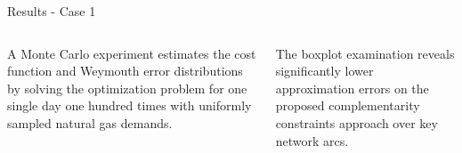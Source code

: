 \documentclass[hyperref={colorlinks,citecolor=blue,linkcolor=blue,urlcolor=blue}]{beamer}
\newlength\figureheight
\newlength\figurewidth
\begin{document}
\begin{frame}{Results - Case 1}
\scriptsize
\begin{columns}[t,onlytextwidth]
    \begin{column}{0.48\textwidth}
        A Monte Carlo experiment estimates the cost function and Weymouth error distributions by solving the optimization problem for one single day one hundred times with uniformly sampled natural gas demands.
        
        \vspace{0.5em}
        \begin{figure}[!htb]
            \centering
            \setlength{}        
            \setlength{}
            
            \label{fig:blue_test_cost}
\end{figure}
    \end{column}
    
    \begin{column}{0.48\textwidth}
        The boxplot examination reveals significantly lower approximation errors on the proposed complementarity constraints approach over key network arcs.
        
        \vspace{2.5em}
        \begin{figure}[!htb]
            \centering
            \setlength{}        
            \setlength{}
            
            \label{fig:blue_test_boxplot}
        \end{figure}
    \end{column}
\end{columns}
\end{frame}
\end{document}
